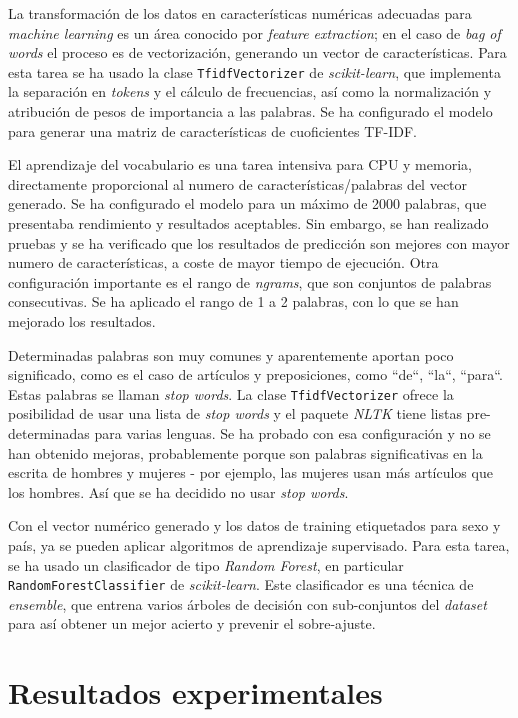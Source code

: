\documentclass[11pt,a4paper]{article}
\begin{document}
  La transformaci\'on de los datos en caracter\'isticas num\'ericas adecuadas para {\em machine learning} es un \'area conocido por {\em feature extraction}; en el caso de {\em bag of words} el proceso es de vectorizaci\'on, generando un vector de caracter\'isticas. Para esta tarea se ha usado la clase {\tt TfidfVectorizer} de {\em scikit-learn}, que implementa la separaci\'on en {\em tokens} y el c\'alculo de frecuencias, así como la normalizaci\'on y atribuci\'on de pesos de importancia a las palabras. Se ha configurado el modelo para generar una matriz de caracter\'isticas de cuoficientes TF-IDF.

  El aprendizaje del vocabulario es una tarea intensiva para CPU y memoria, directamente proporcional al numero de caracter\'isticas/palabras del vector generado. Se ha configurado el modelo para un m\'aximo de 2000 palabras, que presentaba rendimiento y resultados aceptables. Sin embargo, se han realizado pruebas y se ha verificado que los resultados de predicci\'on son mejores con mayor numero de caracter\'isticas, a coste de mayor tiempo de ejecuci\'on. Otra configuraci\'on importante es el rango de {\em ngrams}, que son conjuntos de palabras consecutivas. Se ha aplicado el rango de 1 a 2 palabras, con lo que se han mejorado los resultados.

  Determinadas palabras son muy comunes y aparentemente aportan poco significado, como es el caso de art\'iculos y preposiciones, como ``de``, ``la``, ``para``. Estas palabras se llaman {\em stop words}. La clase {\tt TfidfVectorizer} ofrece la posibilidad de usar una lista de {\em stop words} y el paquete {\em NLTK} tiene listas pre-determinadas para varias lenguas.  Se ha probado con esa configuraci\'on y no se han obtenido mejoras, probablemente porque son palabras significativas en la escrita de hombres y mujeres - por ejemplo, las mujeres usan m\'as art\'iculos que los hombres. As\'i que se ha decidido no usar {\em stop words}.

  Con el vector num\'erico generado y los datos de training etiquetados para sexo y pa\'is, ya se pueden aplicar algoritmos de aprendizaje supervisado. Para esta tarea, se ha usado un clasificador de tipo {\em Random Forest}, en particular {\tt RandomForestClassifier} de {\em scikit-learn}. Este clasificador es una t\'ecnica de {\em ensemble}, que entrena varios \'arboles de decisi\'on con sub-conjuntos del {\em dataset} para as\'i obtener un mejor acierto y prevenir el sobre-ajuste. 


\section{Resultados experimentales}
\end{document}
